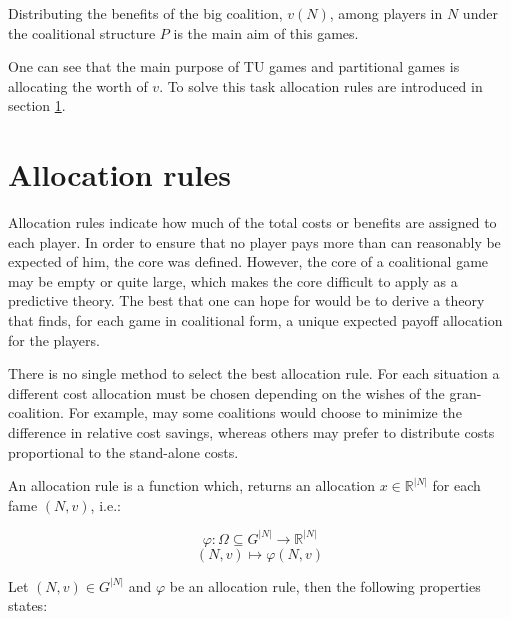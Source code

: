 Distributing the benefits of the big coalition, $v(N)$, among players in $N$ under the coalitional structure $P$ is the main aim of this games. 

One can see that the main purpose of TU games and partitional games is allocating the worth of $v$. To solve this task allocation rules are introduced in section \ref{AllocationRules}.



\section{Allocation rules}\label{AllocationRules}

Allocation rules indicate how much of the total costs or benefits are assigned to each player. 
In order to ensure that no player pays more than can reasonably be expected of him, the core was
defined. However, the core of a coalitional game may be empty or quite large, which makes the core difficult to apply as a predictive theory. The best that one can hope for would be to derive a theory that finds, for each game in coalitional form, a unique expected payoff allocation for the players. 

There is no single method to select the best allocation rule. For each situation a different cost allocation must be chosen depending on the wishes of the gran-coalition. For example, may some coalitions would choose to minimize the difference in relative cost savings, whereas others may prefer to distribute costs proportional to the stand-alone costs. 

An allocation rule is a function which, returns an allocation $x \in \mathbb{R}^{|N|}$ for each fame $(N,v)$, i.e.:

$$\varphi: \Omega \subseteq G^{|N|}  \rightarrow \mathbb{R}^{|N|} $$
$$ (N,v) \longmapsto \varphi(N,v)$$

Let $(N,v) \in  G^{|N|}$ and $\varphi$ be an allocation rule, then the following properties states:

